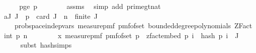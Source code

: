 \begin{isabellebody}
%
\isadelimproof
%
\endisadelimproof
%
\isatagproof
{}\isamarkupfalse%
\ {\isacharminus}{\kern0pt}\isanewline
\ \ \isamarkupfalse%
\ p{\isacharunderscore}{\kern0pt}ge{\isacharunderscore}{\kern0pt}{}{\isacharcolon}{\kern0pt}\ {\isachardoublequoteopen}p\ {\isachargreater}{\kern0pt}\ {}{\isachardoublequoteclose}\isanewline
\ \ \ \ \isamarkupfalse%
\ assms{\isacharparenleft}{\kern0pt}{}{\isacharparenright}{\kern0pt}\ \isamarkupfalse%
\ {\isacharparenleft}{\kern0pt}simp\ add{\isacharcolon}{\kern0pt}\ prime{\isacharunderscore}{\kern0pt}gt{\isacharunderscore}{\kern0pt}{}{\isacharunderscore}{\kern0pt}nat{\isacharparenright}{\kern0pt}\isanewline
\isanewline
\ \ \isamarkupfalse%
\ a{\isacharcolon}{\kern0pt}{\isachardoublequoteopen}{\isasymAnd}J{\isachardot}{\kern0pt}\ J\ {\isasymsubseteq}\ {\isacharbraceleft}{\kern0pt}{}{\isachardot}{\kern0pt}{\isachardot}{\kern0pt}{\isacharless}{\kern0pt}p{\isacharbraceright}{\kern0pt}\ {\isasymLongrightarrow}\ card\ J\ {\isasymle}\ n\ {\isasymLongrightarrow}\ finite\ J\ {\isasymLongrightarrow}\isanewline
\ \ \ \ prob{\isacharunderscore}{\kern0pt}space{\isachardot}{\kern0pt}indep{\isacharunderscore}{\kern0pt}vars\ {\isacharparenleft}{\kern0pt}measure{\isacharunderscore}{\kern0pt}pmf\ {\isacharparenleft}{\kern0pt}pmf{\isacharunderscore}{\kern0pt}of{\isacharunderscore}{\kern0pt}set\ {\isacharparenleft}{\kern0pt}bounded{\isacharunderscore}{\kern0pt}degree{\isacharunderscore}{\kern0pt}polynomials\ {\isacharparenleft}{\kern0pt}ZFact\ {\isacharparenleft}{\kern0pt}int\ p{\isacharparenright}{\kern0pt}{\isacharparenright}{\kern0pt}\ n{\isacharparenright}{\kern0pt}{\isacharparenright}{\kern0pt}{\isacharparenright}{\kern0pt}\isanewline
\ \ \ \ \ \ \ \ {\isacharparenleft}{\kern0pt}{\isacharparenleft}{\kern0pt}{\isasymlambda}x{\isachardot}{\kern0pt}\ measure{\isacharunderscore}{\kern0pt}pmf\ {\isacharparenleft}{\kern0pt}pmf{\isacharunderscore}{\kern0pt}of{\isacharunderscore}{\kern0pt}set\ {\isacharbraceleft}{\kern0pt}{}{\isachardot}{\kern0pt}{\isachardot}{\kern0pt}{\isacharless}{\kern0pt}p{\isacharbraceright}{\kern0pt}{\isacharparenright}{\kern0pt}{\isacharparenright}{\kern0pt}\ {\isasymcirc}\ zfact{\isacharunderscore}{\kern0pt}embed\ p{\isacharparenright}{\kern0pt}\ {\isacharparenleft}{\kern0pt}{\isasymlambda}i\ {\isasymomega}{\isachardot}{\kern0pt}\ hash\ p\ i\ {\isasymomega}{\isacharparenright}{\kern0pt}\ J{\isachardoublequoteclose}\isanewline
\ \ \ \ \isamarkupfalse%
\ {\isacharparenleft}{\kern0pt}subst\ hash{\isachardot}{\kern0pt}simps{\isacharparenright}{\kern0pt}\isanewline

\end{isabellebody}
